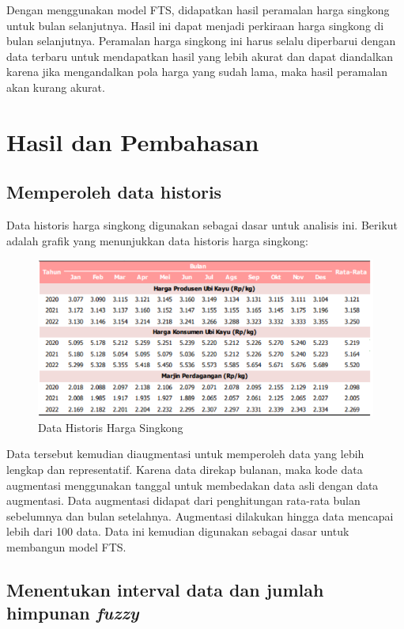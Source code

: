 \documentclass[conference]{IEEEtran}
\begin{document}
Dengan menggunakan model FTS, didapatkan hasil peramalan harga singkong untuk bulan selanjutnya. Hasil ini dapat menjadi perkiraan harga singkong di bulan selanjutnya. Peramalan harga singkong ini harus selalu diperbarui dengan data terbaru untuk mendapatkan hasil yang lebih akurat dan dapat diandalkan karena jika mengandalkan pola harga yang sudah lama, maka hasil peramalan akan kurang akurat.


\section{Hasil dan Pembahasan}

\subsection{Memperoleh data historis}
Data historis harga singkong digunakan sebagai dasar untuk analisis ini. Berikut adalah grafik yang menunjukkan data historis harga singkong:
\begin{figure}[H]
    \centering
    \includegraphics[scale=0.4]{images/Data Historis.png} 
    \caption{Data Historis Harga Singkong}
\end{figure}
Data tersebut kemudian diaugmentasi untuk memperoleh data yang lebih lengkap dan representatif. Karena data direkap bulanan, maka kode data augmentasi menggunakan tanggal untuk membedakan data asli dengan data augmentasi. Data augmentasi didapat dari penghitungan rata-rata bulan sebelumnya dan bulan setelahnya. Augmentasi dilakukan hingga data mencapai lebih dari 100 data. Data ini kemudian digunakan sebagai dasar untuk membangun model FTS.

\subsection{Menentukan interval data dan jumlah himpunan \textit{fuzzy}}
\end{document}
